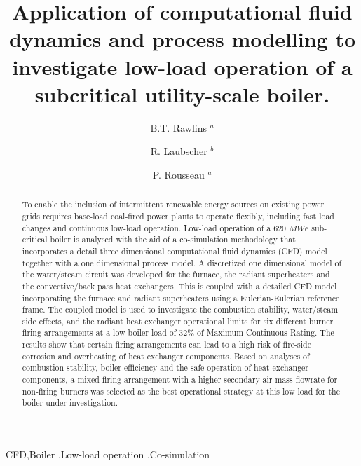 \documentclass[review]{elsarticle}
\begin{document}
\begin{frontmatter}

\title{Application of computational fluid dynamics and process modelling to investigate low-load operation of a subcritical utility-scale boiler.}

\author{B.T. Rawlins $^{a}$ }
\author{R. Laubscher $^b$}
\author{P. Rousseau $^a$}
\address{$^a$ Department of Mechanical Engineering, Applied Thermal-Fluid Process Modelling Research Unit, University of Cape Town, Library Rd, Rondebosch, Cape Town, 7701, South Africa}
\address{$^b$ Department of Mechanical Engineering, Stellenbosch University, Stellenbosch Central, Stellenbosch, 7599, South-Africa}

\begin{abstract}
To enable the inclusion of intermittent renewable energy sources on existing power grids requires base-load coal-fired power plants to operate flexibly, including fast load changes and continuous low-load operation. Low-load operation of a 620 $MWe$ sub-critical boiler is analysed with the aid of a co-simulation methodology that incorporates a detail three dimensional computational fluid dynamics (CFD) model together with a one dimensional process model. A discretized one dimensional model of the water/steam circuit was developed for the furnace, the radiant superheaters and the convective/back pass heat exchangers. This is coupled with a detailed CFD model incorporating the furnace and radiant superheaters using a Eulerian-Eulerian reference frame. The coupled model is used to investigate the combustion stability, water/steam side effects, and the radiant heat exchanger operational limits for six different burner firing arrangements at a low boiler load of 32\% of Maximum Continuous Rating. The results show that certain firing arrangements can lead to a high risk of fire-side corrosion and overheating of heat exchanger components. Based on analyses of combustion stability, boiler efficiency and the safe operation of heat exchanger components, a mixed firing arrangement with a higher secondary air mass flowrate for non-firing burners was selected as the best operational strategy at this low load for the boiler under investigation.
\end{abstract}

\begin{keyword}
CFD\sep Boiler \sep Low-load operation \sep Co-simulation
\end{keyword}
\newpage
\end{frontmatter}
\end{document}

